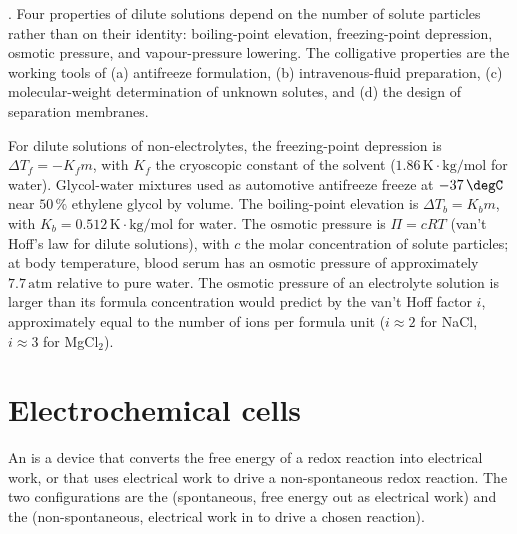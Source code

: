 . Four properties of dilute solutions
depend on the number of solute particles rather than on their identity:
boiling-point elevation, freezing-point depression, osmotic pressure,
and vapour-pressure lowering. The colligative properties are the
working tools of (a) antifreeze formulation, (b) intravenous-fluid
preparation, (c) molecular-weight determination of unknown solutes, and
(d) the design of separation membranes.

For dilute solutions of non-electrolytes, the freezing-point depression
is $\Delta T_f = -K_f m$, with $K_f$ the cryoscopic constant of the
solvent ($1.86\,\si{\kelvin}\cdot\text{kg}/\text{mol}$ for water).
Glycol-water mixtures used as automotive antifreeze freeze at
$-37\,\degC$ near $50\,\%$ ethylene glycol by volume. The boiling-point
elevation is $\Delta T_b = K_b m$, with $K_b = 0.512\,\si{\kelvin}\cdot
\text{kg}/\text{mol}$ for water. The osmotic pressure is $\Pi = c R T$
(van't Hoff's law for dilute solutions), with $c$ the molar
concentration of solute particles; at body temperature, blood serum
has an osmotic pressure of approximately $7.7\,\text{atm}$ relative to
pure water. The osmotic pressure of an electrolyte solution is larger
than its formula concentration would predict by the van't Hoff factor
$i$, approximately equal to the number of ions per formula unit
($i \approx 2$ for NaCl, $i \approx 3$ for MgCl$_2$).

\section{Electrochemical cells}

An  is a device that converts the free
energy of a redox reaction into electrical work, or that uses electrical
work to drive a non-spontaneous redox reaction. The two configurations
are the  (spontaneous, free energy out as
electrical work) and the  (non-spontaneous,
electrical work in to drive a chosen reaction).

